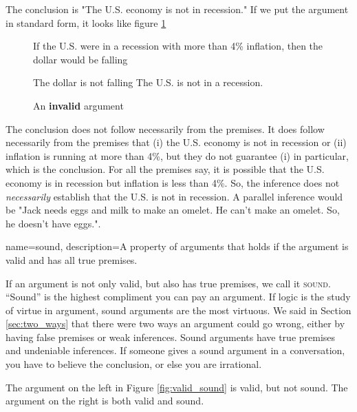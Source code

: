 The conclusion is "The U.S. economy is not in recession." If we put the argument in standard form, it looks like figure \ref{fig:invalid_recession}

\begin{figure}
\begin{mdframed}[style=mytablebox]
\begin{earg*}
\item If the U.S. were in a recession with more than 4\% inflation, then the dollar would be falling
\item The dollar is not falling
\itemc[.3] The U.S. is not in a recession. 
\end{earg*}
\end{mdframed}
\caption{An \textbf{invalid} argument} \label{fig:invalid_recession}
\end{figure}

The conclusion does not follow necessarily from the premises. It does follow necessarily from the premises that (i) the U.S. economy is not in recession or (ii) inflation is running at more than 4\%, but they do not guarantee (i) in particular, which is the conclusion. For all the premises say, it is possible that the U.S. economy is in recession but inflation is less than 4\%. So, the inference does not \textit{necessarily} establish that the U.S. is not in recession. A parallel inference would be "Jack needs eggs and milk to make an omelet. He can't make an omelet. So, he doesn't have eggs.". 

{
name=sound,
description={A property of arguments that holds if the argument is valid and has all true premises.}
}

If an argument is not only valid, but also has true premises, we call it \textsc{\gls{sound}}. \label{def:sound} ``Sound'' is the highest compliment you can pay an argument. If logic is the study of virtue in argument, sound arguments are the most virtuous. We said in Section \ref{sec:two_ways} that there were two ways an argument could go wrong, either by having false premises or weak inferences. Sound arguments have true premises and undeniable inferences. If someone gives a sound argument in a conversation, you have to believe the conclusion, or else you are irrational.  

The argument on the left in Figure \ref{fig:valid_sound} is valid, but not sound. The argument on the right is both valid and sound.

